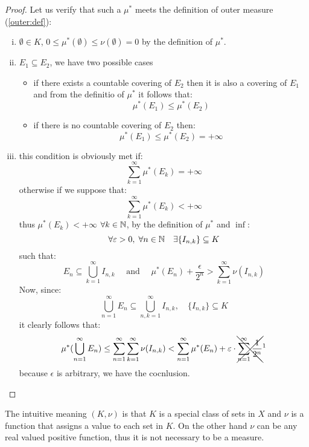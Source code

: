 \begin{proof}
    Let us verify that such a $\mu^*$ meets the definition of outer measure (\ref{outer:def}):
    \begin{enumerate}[i)]
        \item $\emptyset\in K$, $0\leq\mu^*(\emptyset)\leq\nu(\emptyset)=0$ by the definition of $\mu^*$.
        \item $E_1\subseteq E_2$, we have two possible cases
              \begin{itemize}
                  \item if there exists a countable covering of $E_2$ then it is also a covering of $E_1$ and from the definitio of $\mu^*$ it follows that:
                        \[
                            \mu^*(E_1) \leq \mu^*(E_2)
                        \]
                  \item if there is no countable covering of $E_2$ then:
                        \[
                            \mu^*(E_1) \leq \mu^*(E_2) = +\infty
                        \]
              \end{itemize}
        \item this condition is obviously met if:
              \[
                  \sum_{k=1}^{\infty} \mu^*(E_k) = +\infty
              \]
              otherwise if we suppose that:
              \[
                  \sum_{k=1}^{\infty} \mu^*(E_k) < +\infty
              \]
              thus $\mu^*(E_k)<+\infty$ $\forall k\in\N$, by the definition of $\mu^*$ and $\inf$:
              \[
                  \forall \epsilon>0, \; \forall n\in\N \quad \exists \{ I_{n,k} \} \subseteq K
              \]
              such that:
              \[
                  E_n \subseteq \bigcup_{k=1}^{\infty} I_{n,k} \quad \text{ and } \quad \mu^*(E_n)+\frac{\epsilon}{2^n} > \sum_{k=1}^{\infty} \nu(I_{n,k})
              \]
              Now, since:
              \[
                  \bigcup_{n=1}^{\infty} E_n \subseteq \bigcup_{n,k=1}^{\infty} I_{n,k}, \quad \{ I_{n,k} \} \subseteq K
              \]
              it clearly follows that:
              \[
                  \mu^*(\bigcup_{n=1}^{\infty} E_n) \leq \sum_{n=1}^{\infty} \sum_{k=1}^{\infty} \nu(I_{n,k}) < \sum_{n=1}^{\infty}\mu^*(E_n) + \epsilon\cdot\xcancel{\sum_{n=1}^{\infty} \frac{1}{2^n}}^1
              \]
              because $\epsilon$ is arbitrary, we have the cocnlusion.
    \end{enumerate}
\end{proof}

The intuitive meaning $(K,\nu)$ is that $K$ is a special class of sets in $X$ and $\nu$ is a function that assigns a value to each set in $K$. On the other hand $\nu$ can be any real valued positive function, thus it is not necessary to be a measure.

